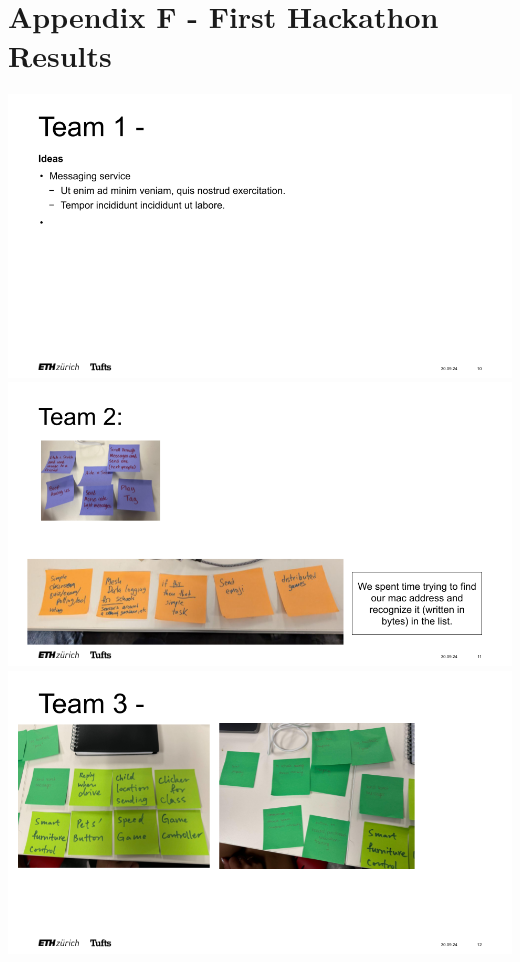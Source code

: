 \cleardoublepage%
\chapter*{\label{chap:apx_g}Appendix F - First Hackathon Results}%
%



\includegraphics[width=\linewidth]{overleaf/images/Hackathon1.png}
\includegraphics[width=\linewidth]{overleaf/images/Hackathon2.png}
\includegraphics[width=\linewidth]{overleaf/images/Hackathon3.png}
